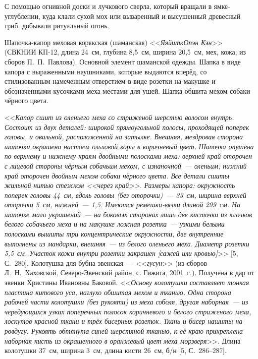 С помощью огнивной доски и лучкового сверла, который вращали в ямке-углублении, куда клали сухой мох или вываренный и высушенный древесный гриб, добывали ритуальный огонь.

Шапочка-капор меховая корякская (шаманская) <<\textit{ЯяйиткОпэн Кэн}>> (СВКНИИ КП-12, длина 24~см, глубина 8,5~см, ширина 20,5~см, мех, кожа; из сборов П.~П.~Павлова). Основной элемент шаманской одежды. Шапка в виде капора с выраженными наушниками, которые выдаются вперёд, со стилизованным намеченным отверстием в виде розетки на макушке и обозначенными кусочками меха местами для ушей. Шапка обшита мехом собаки чёрного цвета.

<<\textit{Капор сшит из оленьего меха со стриженой шерстью волосом внутрь. Состоит из двух деталей: широкой прямоугольной полосы, проходящей поперек головы, и овальной, расположенной на затылке. Внешняя, мездровая сторона шапочки окрашена настоем ольховой коры в коричневый цвет. Шапочка опушена по верхнему и нижнему краям двойными полосками меха: верхней край оторочен с лицевой стороны чёрным собачьим мехом, с изнаночной~--- оленьим; нижний край оторочен двойным мехом собаки чёрного цвета. Все детали сшиты жильной нитью стежком <<\textit{через край}>>. Размеры капора: окружность поперек головы 44~см, вдоль головы (без оторочки)~--- 33~см, ширина верхней оторочки 5~см, нижней~--- 1,5. Имеются ремешки-вязки длиной 299~см. На шапочке мало украшений~--- на боковых сторонах лишь две кисточки из клочков белого собачьего меха и на макушке ложная розетка~--- узкими белыми полосками вышиты три концентрические окружности, две внутренние выполнены из мандарки, внешняя~--- из белого оленьего меха. Диаметр розетки 5,5~см. Участок кожи внутри розетки закрашен [сажей или кровью]}>> [5, С.~280].
\clearpage
Колотушка для бубна эвенская~--- <<\textit{гусун}>> (из сборов Л.~Н.~Хаховской, Северо-Эвенский район, с. Гижига, 2001~г.). Получена в дар от эвенки Христины Ивановны Баковой. <<\textit{Основу колотушки составляет тонкая пластина китового уса, наглухо обшитая мехом и тканью. Одна сторона рабочей части колотушки (без рукояти) из меха соболя, другая наборная~--- из чередующихся узких поперечных полосок коричневого и белого стриженого меха, лоскутов красной ткани и трёх бисерных розеток. Ткань и бисер нашиты на ровдугу. Рукоять обтянута синей шерстяной тканью, к её краю прикреплена наборная кисть из окрашенного в оранжевый цвет меха морзверя}>>. Длина колотушки 37~см, ширина 3~см, длина кисти 26~см, б/н [5, С.~286--287].

